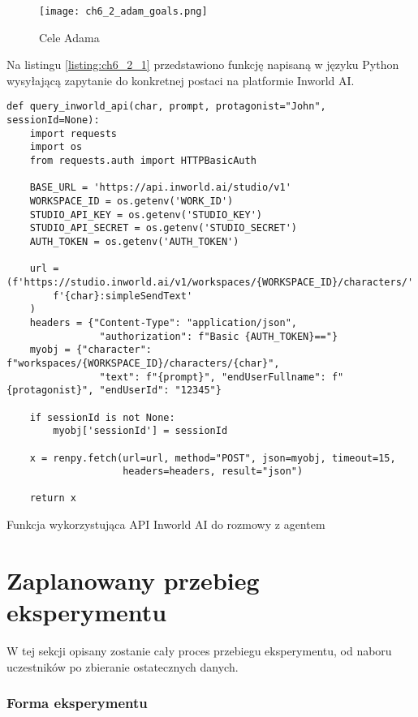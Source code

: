 \begin{figure}[h!]
    \centering
    \texttt{[image: ch6\_2\_adam\_goals.png]}
    \caption{Cele Adama}
    \label{fig:ch6_2_adam_goals}
\end{figure}

\newpage

Na listingu \ref{listing:ch6_2_1} przedstawiono funkcję napisaną w języku Python wysyłającą zapytanie
do konkretnej postaci na platformie Inworld AI.

\begin{listing}
    \begin{verbatim}  
def query_inworld_api(char, prompt, protagonist="John", sessionId=None):
    import requests
    import os
    from requests.auth import HTTPBasicAuth

    BASE_URL = 'https://api.inworld.ai/studio/v1'
    WORKSPACE_ID = os.getenv('WORK_ID')
    STUDIO_API_KEY = os.getenv('STUDIO_KEY')
    STUDIO_API_SECRET = os.getenv('STUDIO_SECRET')
    AUTH_TOKEN = os.getenv('AUTH_TOKEN')

    url = (f'https://studio.inworld.ai/v1/workspaces/{WORKSPACE_ID}/characters/'
        f'{char}:simpleSendText'
    )
    headers = {"Content-Type": "application/json",
                "authorization": f"Basic {AUTH_TOKEN}=="}
    myobj = {"character": f"workspaces/{WORKSPACE_ID}/characters/{char}",
                "text": f"{prompt}", "endUserFullname": f"{protagonist}", "endUserId": "12345"}

    if sessionId is not None:
        myobj['sessionId'] = sessionId

    x = renpy.fetch(url=url, method="POST", json=myobj, timeout=15,
                    headers=headers, result="json")

    return x
\end{verbatim}
    \caption{Funkcja wykorzystująca API Inworld AI do rozmowy z agentem} \label{listing:ch6_2_1}
\end{listing}

\section{Zaplanowany przebieg eksperymentu}\label{section:ch6_3}

W tej sekcji opisany zostanie cały proces przebiegu eksperymentu, od naboru uczestników po
zbieranie ostatecznych danych.

\subsubsection*{Forma eksperymentu}


